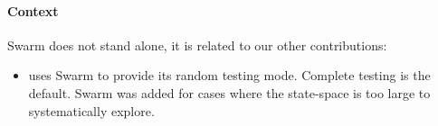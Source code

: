 \paragraph{Context}
Swarm does not stand alone, it is related to our other contributions:

\begin{itemize}
\item {} uses Swarm to provide its random testing mode.
  Complete testing is the default.  Swarm was added for cases where
  the state-space is too large to systematically explore.
\end{itemize}
